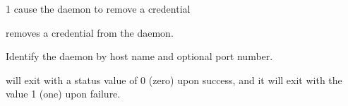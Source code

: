 \begin{ManPage}{\label{man-stork-rm-cred}}{1}
{cause the  daemon to remove a credential}
\Synopsis {}
\ToolArgsBase




\Description 

 removes a credential from the  daemon.

\begin{Options}
  \ToolArgsBaseDesc
    {Identify the  daemon
    by host name and optional port number.}
\end{Options}

\ExitStatus

 will exit with a status value of 0 (zero) upon success,
and it will exit with the value 1 (one) upon failure.

\end{ManPage}
